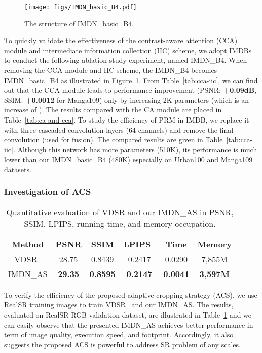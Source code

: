 \documentclass[sigconf]{acmart}
\begin{document}
\begin{figure}
	\centering
	\texttt{[image: figs/IMDN\_basic\_B4.pdf]}
	\caption{The structure of IMDN\_basic\_B4.}
	\label{fig:IMDN-basic-B4}
	\vspace{-3mm}
\end{figure}

To quickly validate the effectiveness of the contrast-aware attention (CCA) module and intermediate information collection (IIC) scheme, we adopt  IMDBs to conduct the following ablation study experiment, named IMDN\_B4. When removing the CCA module and IIC scheme, the IMDN\_B4 becomes IMDN\_basic\_B4 as illustrated in Figure~\ref{fig:IMDN-basic-B4}. From Table~\ref{tab:cca-iic}, we can find out that the CCA module leads to performance improvement (PSNR: \textbf{+0.09dB}, SSIM: \textbf{+0.0012} for  Manga109) only by increasing 2K parameters (which is an increase of ). The results compared with the CA module are placed in Table~\ref{tab:ca-and-cca}. To study the efficiency of PRM in IMDB, we replace it with three cascaded  convolution layers (64 channels) and remove the final  convolution (used for fusion). The compared results are given in Table~\ref{tab:cca-iic}. Although this network has more parameters (510K), its performance is much lower than our IMDN\_basic\_B4 (480K) especially on Urban100 and Manga109 datasets.

\subsubsection{Investigation of ACS}
\begin{table}[htpb]
	\centering
	\small
	\caption{Quantitative evaluation of VDSR and our IMDN\_AS in PSNR, SSIM, LPIPS, running time, and memory occupation.}
	\label{fig:study-acs}
	\begin{tabular}{|c|c|c|c|c|c|}
		\hline
		Method & PSNR & SSIM & LPIPS~\cite{LPIPS} & Time & Memory \\
		\hline
		VDSR~\cite{VDSR} & 28.75 & 0.8439 & 0.2417 & 0.0290 & 7,855M \\ 
		IMDN\_AS & \textbf{29.35} & \textbf{0.8595} & \textbf{0.2147} & \textbf{0.0041} & \textbf{3,597M} \\
		\hline
	\end{tabular}
\end{table}

To verify the efficiency of the proposed adaptive cropping strategy (ACS), we use RealSR training images to train VDSR~\cite{VDSR} and our IMDN\_AS. The results, evaluated on RealSR RGB validation dataset, are illustrated in Table~\ref{fig:study-acs} and we can easily observe that the presented IMDN\_AS achieves better performance in term of image quality, execution speed, and footprint. Accordingly, it also suggests the proposed ACS is powerful to address SR problem of any scales.
\end{document}
